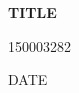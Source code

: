 \documentclass[a4paper,12pt]{article} %
\begin{document}
	\begin{titlepage}
        \centering
        {\huge\bfseries TITLE \par}
        \vspace{1.5cm}
        {\Large 150003282 \par}
        \vspace{0.5cm}
        {\large DATE \par}
        \vspace{0.5cm}
    \end{titlepage}

    \pagebreak



	
	




	
	\pagebreak

   

\end{document}
